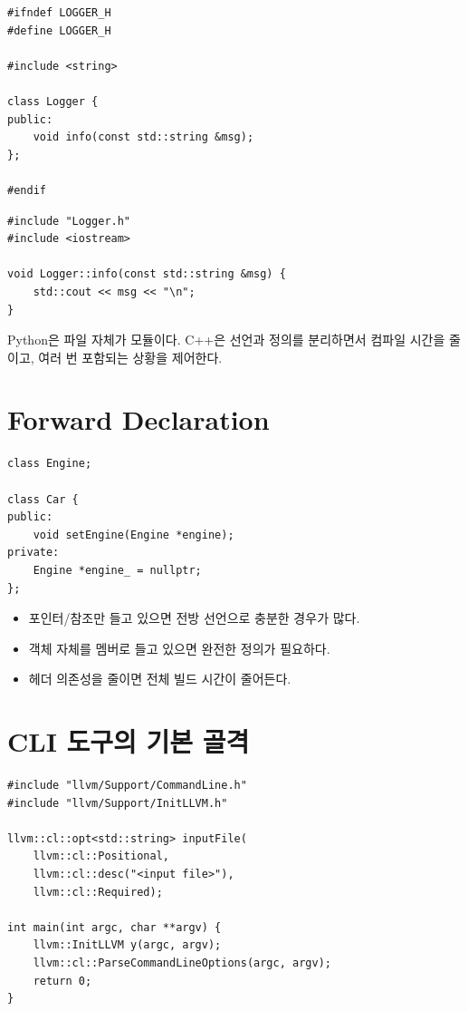 \documentclass[11pt,a4paper]{book}
\begin{document}
\begin{lstlisting}[style=cpp,title={헤더 파일}]
#ifndef LOGGER_H
#define LOGGER_H

#include <string>

class Logger {
public:
    void info(const std::string &msg);
};

#endif
\end{lstlisting}

\begin{lstlisting}[style=cpp,title={구현 파일}]
#include "Logger.h"
#include <iostream>

void Logger::info(const std::string &msg) {
    std::cout << msg << "\n";
}
\end{lstlisting}

\begin{pythonbox}
Python은 파일 자체가 모듈이다. C++은 선언과 정의를 분리하면서 컴파일 시간을 줄이고, 여러 번 포함되는 상황을 제어한다.
\end{pythonbox}

\section{Forward Declaration}

\begin{lstlisting}[style=cpp,title={가능한 경우 전방 선언}]
class Engine;

class Car {
public:
    void setEngine(Engine *engine);
private:
    Engine *engine_ = nullptr;
};
\end{lstlisting}

\begin{summarybox}
\begin{itemize}[nosep]
\item 포인터/참조만 들고 있으면 전방 선언으로 충분한 경우가 많다.
\item 객체 자체를 멤버로 들고 있으면 완전한 정의가 필요하다.
\item 헤더 의존성을 줄이면 전체 빌드 시간이 줄어든다.
\end{itemize}
\end{summarybox}

\section{CLI 도구의 기본 골격}

\begin{lstlisting}[style=cpp,title={LLVM 스타일 CLI 도구}]
#include "llvm/Support/CommandLine.h"
#include "llvm/Support/InitLLVM.h"

llvm::cl::opt<std::string> inputFile(
    llvm::cl::Positional,
    llvm::cl::desc("<input file>"),
    llvm::cl::Required);

int main(int argc, char **argv) {
    llvm::InitLLVM y(argc, argv);
    llvm::cl::ParseCommandLineOptions(argc, argv);
    return 0;
}
\end{lstlisting}
\end{document}

